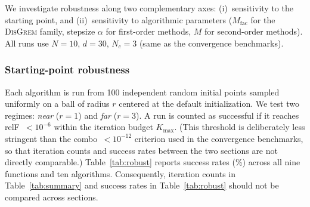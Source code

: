 \documentclass[review,onefignum,onetabnum]{siamart171218}
\begin{document}
	We investigate robustness along two complementary axes:
	(i)~sensitivity to the starting point, and
	(ii)~sensitivity to algorithmic parameters ($M_{\mathrm{fac}}$ for
	the \textsc{DisGrem} family, stepsize $\alpha$ for first-order methods, $M$
	for second-order methods).
	All runs use $N{=}10$, $d{=}30$, $N_c{=}3$ (same as the convergence
	benchmarks).
	
	\subsubsection{Starting-point robustness}
	
	Each algorithm is run from 100 independent random initial points
	sampled uniformly on a ball of radius $r$ centered at the default
	initialization.
	We test two regimes: \textit{near} ($r{=}1$) and \textit{far}
	($r{=}3$).
	A run is counted as successful if it reaches relF~$<10^{-6}$
	within the iteration budget $K_{\max}$.
	(This threshold is deliberately less stringent than the combo~$<10^{-12}$
	criterion used in the convergence benchmarks, so that iteration counts
	and success rates between the two sections are not directly comparable.)
	Table~\ref{tab:robust} reports
	success rates (\%) across all nine functions and ten algorithms.
	Consequently, iteration counts in Table~\ref{tab:summary}
	and success rates in Table~\ref{tab:robust}
	should not be compared across sections.
	
\end{document}
